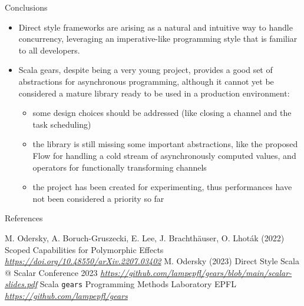 \documentclass[aspectratio=1610,xcolor=dvipsnames]{beamer}
\begin{document}

\begin{frame}{Conclusions}
  \begin{itemize}
      \item Direct style frameworks are arising as a natural and intuitive way to handle concurrency, leveraging an imperative-like programming style that is familiar to all developers.
      \item Scala gears, despite being a very young project, provides a good set of abstractions for asynchronous programming, although it cannot yet be considered a mature library ready to be used in a production environment:
      \begin{itemize}
          \item some design choices should be addressed (like closing a channel and the task scheduling)
          \item the library is still missing some important abstractions, like the proposed Flow for handling a cold stream of asynchronously computed values, and operators for functionally transforming channels
          \item  the project has been created for experimenting, thus performances have not been considered a priority so far
      \end{itemize}
  \end{itemize}
\end{frame}


\begin{frame}{References}
  \footnotesize{
      \begin{thebibliography}{99}
           M. Odersky, A. Boruch-Gruszecki, E. Lee, J. Brachthäuser, O. Lhoták (2022)
          \newblock Scoped Capabilities for Polymorphic Effects
          \newblock \emph{\href{https://doi.org/10.48550/arXiv.2207.03402}{https://doi.org/10.48550/arXiv.2207.03402}}
           M. Odersky (2023)
          \newblock Direct Style Scala @ Scalar Conference 2023 
          \newblock \emph{\href{https://github.com/lampepfl/gears/blob/main/scalar-slides.pdf}{https://github.com/lampepfl/gears/blob/main/scalar-slides.pdf}}
           Scala \texttt{gears}
          \newblock Programming Methods Laboratory EPFL
          \newblock \emph{\href{https://github.com/lampepfl/gears}{https://github.com/lampepfl/gears}}
      \end{thebibliography}
  }
\end{frame}

\end{document}
